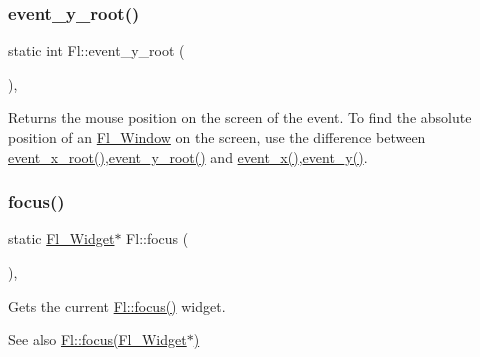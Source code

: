 \subsubsection{\texorpdfstring{event\+\_\+y\+\_\+root()}{event\_y\_root()}}
{\footnotesize\ttfamily static int Fl\+::event\+\_\+y\+\_\+root (\begin{DoxyParamCaption}{ }\end{DoxyParamCaption})\hspace{0.3cm}{\ttfamily [inline]}, {\ttfamily [static]}}

Returns the mouse position on the screen of the event. To find the absolute position of an \hyperlink{class_fl___window}{Fl\+\_\+\+Window} on the screen, use the difference between \hyperlink{group__fl__events_ga4c40bd0d2960354c9778fdb65a2b720d}{event\+\_\+x\+\_\+root()},\hyperlink{group__fl__events_ga9801003f911eae0e49bf52b875dcaaa5}{event\+\_\+y\+\_\+root()} and \hyperlink{group__fl__events_ga91585fcbaa1e79f7452fd2d16a82136e}{event\+\_\+x()},\hyperlink{group__fl__events_ga192a0c5a37f33b9d117a69f20977c2a1}{event\+\_\+y()}. \mbox{\label{group__fl__events_ga7f0e9836db43268979e0b3a999583b7f}} 
\subsubsection{\texorpdfstring{focus()}{focus()}\hspace{0.1cm}{\footnotesize\ttfamily [1/2]}}
{\footnotesize\ttfamily static \hyperlink{class_fl___widget}{Fl\+\_\+\+Widget}$\ast$ Fl\+::focus (\begin{DoxyParamCaption}{ }\end{DoxyParamCaption})\hspace{0.3cm}{\ttfamily [inline]}, {\ttfamily [static]}}

Gets the current \hyperlink{group__fl__events_ga7f0e9836db43268979e0b3a999583b7f}{Fl\+::focus()} widget. \begin{DoxySeeAlso}{See also}
\hyperlink{group__fl__events_ga1b3d0faad436e706677d9d9d2ba2baf8}{Fl\+::focus(\+Fl\+\_\+\+Widget$\ast$)} 
\end{DoxySeeAlso}
\mbox{\label{group__fl__events_ga1b3d0faad436e706677d9d9d2ba2baf8}} 
